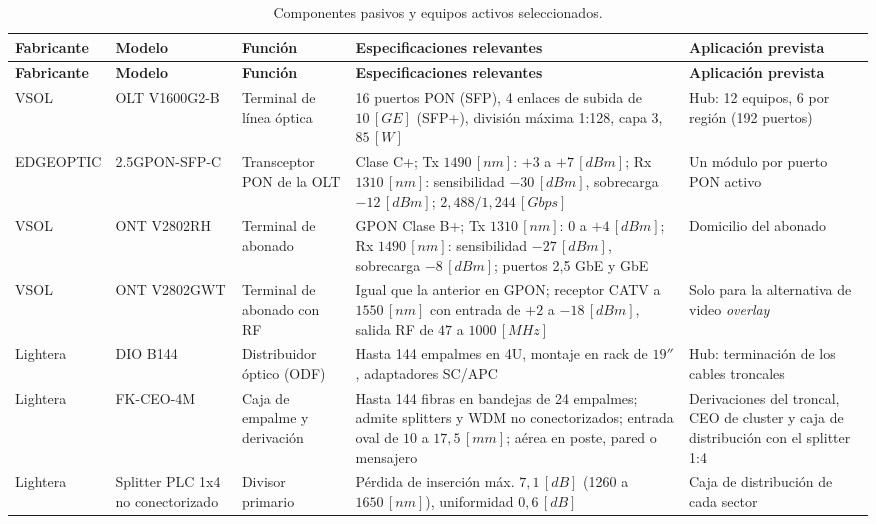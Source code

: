 \begin{longtable}{|p{1.9cm}|p{2.4cm}|p{2.4cm}|p{4.4cm}|p{2.5cm}|}
    \caption{Componentes pasivos y equipos activos seleccionados.}\label{tab:componentes}\\
    \hline
    \textbf{Fabricante} & \textbf{Modelo} & \textbf{Función} & \textbf{Especificaciones relevantes} & \textbf{Aplicación prevista} \\
    \hline
    \endfirsthead
    \hline
    \textbf{Fabricante} & \textbf{Modelo} & \textbf{Función} & \textbf{Especificaciones relevantes} & \textbf{Aplicación prevista} \\
    \hline
    \endhead
    VSOL \cite{vsol_olt} & OLT V1600G2-B & Terminal de línea óptica & 16 puertos PON (SFP), 4 enlaces de subida de $10 \, [GE]$ (SFP+), división máxima 1:128, capa 3, $85 \, [W]$ & Hub: 12 equipos, 6 por región (192 puertos) \\
    \hline
    EDGEOPTIC \cite{sfp_cplus} & 2.5GPON-SFP-C & Transceptor PON de la OLT & Clase C+; Tx $1490 \, [nm]$: $+3$ a $+7 \, [dBm]$; Rx $1310 \, [nm]$: sensibilidad $-30 \, [dBm]$, sobrecarga $-12 \, [dBm]$; $2{,}488/1{,}244 \, [Gbps]$ & Un módulo por puerto PON activo \\
    \hline
    VSOL \cite{vsol_ont} & ONT V2802RH & Terminal de abonado & GPON Clase B+; Tx $1310 \, [nm]$: $0$ a $+4 \, [dBm]$; Rx $1490 \, [nm]$: sensibilidad $-27 \, [dBm]$, sobrecarga $-8 \, [dBm]$; puertos 2,5 GbE y GbE & Domicilio del abonado \\
    \hline
    VSOL \cite{vsol_catv} & ONT V2802GWT & Terminal de abonado con RF & Igual que la anterior en GPON; receptor CATV a $1550 \, [nm]$ con entrada de $+2$ a $-18 \, [dBm]$, salida RF de $47$ a $1000 \, [MHz]$ & Solo para la alternativa de video \textit{overlay} \\
    \hline
    Lightera \cite{dio_b144} & DIO B144 & Distribuidor óptico (ODF) & Hasta 144 empalmes en 4U, montaje en rack de $19''$, adaptadores SC/APC & Hub: terminación de los cables troncales \\
    \hline
    Lightera \cite{et_ceo} & FK-CEO-4M & Caja de empalme y derivación & Hasta 144 fibras en bandejas de 24 empalmes; admite splitters y WDM no conectorizados; entrada oval de $10$ a $17{,}5 \, [mm]$; aérea en poste, pared o mensajero & Derivaciones del troncal, CEO de cluster y caja de distribución con el splitter 1:4 \\
    \hline
    Lightera \cite{et_splitter} & Splitter PLC 1x4 no conectorizado & Divisor primario & Pérdida de inserción máx. $7{,}1 \, [dB]$ (1260 a $1650 \, [nm]$), uniformidad $0{,}6 \, [dB]$ & Caja de distribución de cada sector \\

\end{longtable}

